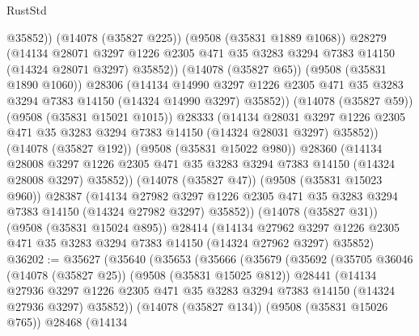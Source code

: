 \begin{lexlean}{RustStd}
\begin{coremodule}
                  @35852))
              (@14078 (@35827 @225))
              (@9508 (@35831 @1889 @1068))
              @28279
              (@14134
                @28071
                @3297
                @1226
                @2305
                @471
                @35
                @3283
                @3294
                @7383
                @14150
                (@14324 @28071 @3297)
                @35852))
            (@14078 (@35827 @65))
            (@9508 (@35831 @1890 @1060))
            @28306
            (@14134
              @14990
              @3297
              @1226
              @2305
              @471
              @35
              @3283
              @3294
              @7383
              @14150
              (@14324 @14990 @3297)
              @35852))
          (@14078 (@35827 @59))
          (@9508 (@35831 @15021 @1015))
          @28333
          (@14134
            @28031
            @3297
            @1226
            @2305
            @471
            @35
            @3283
            @3294
            @7383
            @14150
            (@14324 @28031 @3297)
            @35852))
        (@14078 (@35827 @192))
        (@9508 (@35831 @15022 @980))
        @28360
        (@14134
          @28008
          @3297
          @1226
          @2305
          @471
          @35
          @3283
          @3294
          @7383
          @14150
          (@14324 @28008 @3297)
          @35852))
      (@14078 (@35827 @47))
      (@9508 (@35831 @15023 @960))
      @28387
      (@14134
        @27982
        @3297
        @1226
        @2305
        @471
        @35
        @3283
        @3294
        @7383
        @14150
        (@14324 @27982 @3297)
        @35852))
    (@14078 (@35827 @31))
    (@9508 (@35831 @15024 @895))
    @28414
    (@14134 @27962 @3297 @1226 @2305 @471 @35 @3283 @3294 @7383 @14150 (@14324 @27962 @3297) @35852)
@36202 := @35627
    (@35640
      (@35653
        (@35666
          (@35679
            (@35692
              (@35705
                @36046
                (@14078 (@35827 @25))
                (@9508 (@35831 @15025 @812))
                @28441
                (@14134
                  @27936
                  @3297
                  @1226
                  @2305
                  @471
                  @35
                  @3283
                  @3294
                  @7383
                  @14150
                  (@14324 @27936 @3297)
                  @35852))
              (@14078 (@35827 @134))
              (@9508 (@35831 @15026 @765))
              @28468
              (@14134

\end{coremodule}
\end{lexlean}
